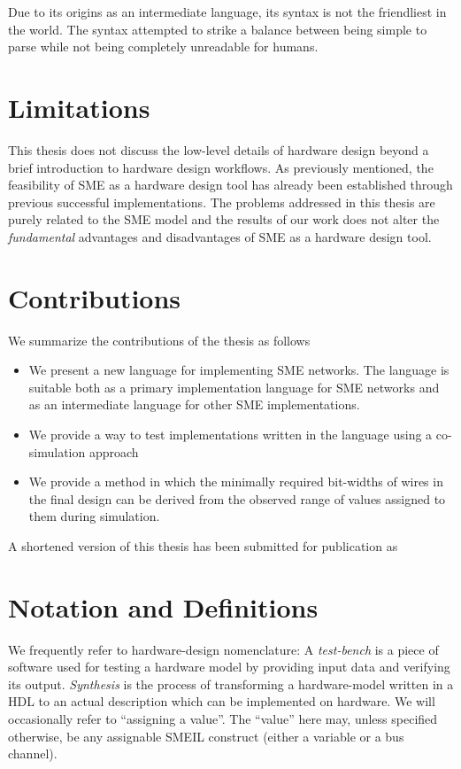 Due to its origins as an intermediate language, its syntax is not the
friendliest in the world. The syntax attempted to strike a balance between being
simple to parse while not being completely unreadable for humans.

\section{Limitations}
This thesis does not discuss the low-level details of hardware design beyond a
brief introduction to hardware design workflows. As previously mentioned, the
feasibility of SME as a hardware design tool has already been established
through previous successful implementations. The problems addressed in this
thesis are purely related to the SME model and the results of our work does not
alter the {\itshape fundamental} advantages and disadvantages of SME as a
hardware design tool.


\section{Contributions}
We summarize the contributions of the thesis as follows

\begin{itemize}
\item We present a new language for implementing SME networks. The language is
  suitable both as a primary implementation language for SME networks and as an
  intermediate language for other SME implementations.
\item We provide a way to test implementations written in the language using a
  co-simulation approach  
\item We provide a method in which the minimally required bit-widths of wires in
  the final design can be derived from the observed range of values assigned to
  them during simulation.
\end{itemize}

A shortened version of this thesis has been submitted for publication as

\section{Notation and Definitions}
We frequently refer to hardware-design nomenclature: A {\itshape test-bench} is a
piece of software used for testing a hardware model by providing input data and
verifying its output. {\itshape Synthesis} is the process of transforming a
hardware-model written in a HDL to an actual description which can be
implemented on hardware. We will occasionally refer to ``assigning a
value''. The ``value'' here may, unless specified otherwise, be any assignable
SMEIL construct (either a variable or a bus channel).



